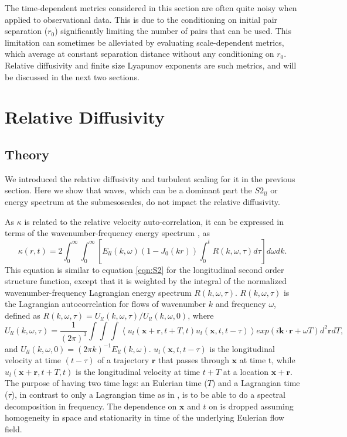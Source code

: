 \documentclass[]{ametsoc}
\begin{document}
The time-dependent metrics considered in this section are often quite noisy when applied to observational data. This is due to the conditioning on initial pair separation ($r_0$) significantly limiting the number of pairs that can be used. This limitation can sometimes be alleviated by evaluating scale-dependent metrics, which average at constant separation distance without any conditioning on $r_0$. Relative diffusivity and finite size Lyapunov exponents are such metrics, and will be discussed in the next two sections.
 
\section{Relative Diffusivity}
\subsection{Theory}
We introduced the relative diffusivity and turbulent scaling for it in the previous section. Here we show that waves, which can be a dominant part the $S2_{ll}$ or energy spectrum at the submesoscales, do not impact the relative diffusivity.

As $\kappa$ is related to the relative velocity auto-correlation, it can be expressed in terms of the wavenumber-frequency energy spectrum \citep{bennett1984relative, babiano1990relative}, as 
\begin{equation}
    \kappa(r,t) = 2\int_0^\infty \int_0^\infty \left[ E_{ll}(k, \omega)  (1- J_0(kr)) \int_0^t R(k, \omega,\tau) d\tau \right] d\omega dk.
    \label{eqn:diff_spectrum}
\end{equation}
This equation is similar to equation \ref{eqn:S2} for the longitudinal second order structure function, except that it is weighted by the integral of the normalized wavenumber-frequency Lagrangian energy spectrum $R(k, \omega, \tau)$. $R(k, \omega, \tau)$ is the Lagrangian autocorrelation for flows of wavenumber $k$ and frequency $\omega$, defined as $R(k, \omega, \tau) = U_{ll}(k, \omega , \tau) /U_{ll}(k, \omega , 0)$, where
\begin{equation}
    U_{ll}(k, \omega , \tau) = \frac{1}{(2\pi)^3} \int \int \int \left< u_l (\mathbf{x} + \mathbf{r}, t + T, t) u_l (\mathbf{x}, t , t - \tau)\right> exp(i \mathbf{k}\cdot \mathbf{r} + \omega T)  d^2 \mathbf{r} dT,
    \label{eqn:lag_autocorr}
\end{equation}
and $U_{ll}(k, \omega , 0) = (2\pi k)^{-1} E_{ll}(k,\omega)$. $u_l (\mathbf{x}, t , t - \tau)$ is the longitudinal velocity at time $(t - \tau)$ of a trajectory $\mathbf{r}$ that passes through $\mathbf{x}$ at time t, while $u_l (\mathbf{x} + \mathbf{r}, t + T , t )$ is the longitudinal velocity at time $t+T$ at a location $\mathbf{x}+\mathbf{r}$. The purpose of having two time lags: an Eulerian time ($T$) and a Lagrangian time ($\tau$), in contrast to only a Lagrangian time as in \citet{bennett1984relative}, is to be able to do a spectral decomposition in frequency. The dependence on $\mathbf{x}$ and $t$ on is dropped assuming homogeneity in space and stationarity in time of the underlying Eulerian flow field. 
\end{document}
